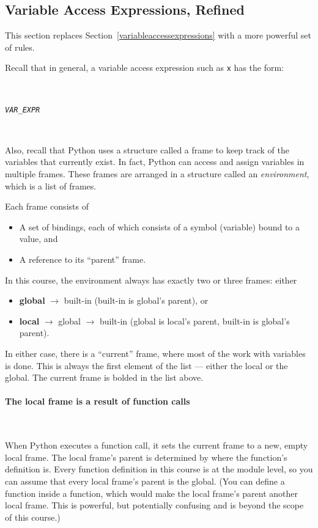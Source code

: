 \documentclass{article}
\newcommand{\expr}[1]{\texttt{#1}}
\newcommand{\ra}{ \ensuremath{\rightarrow} }
\newcommand{\mvar}[1]{\expr{\emph{\uppercase{#1}}}}
\newcommand{\myparagraph}[1]{\paragraph{#1} \ifhevea\else \strut \\ \strut \fi}
\newcommand{\pretabularspace}{\ifhevea\else \strut \\ \strut \fi}
\newcommand{\posttabularspace}{\ifhevea\else \strut \\ \strut \fi}
\begin{document}
\subsection{Variable Access Expressions, Refined}
\label{accesseswithfunctions}

This section replaces Section~\ref{variableaccessexpressions} with a more
powerful set of rules.

  Recall that in general, a variable access expression such as \expr{x} has the form:

  \pretabularspace
  \mvar{VAR\_EXPR}
  \posttabularspace

  Also, recall that Python uses a structure called a frame to keep track of the variables that currently exist. In fact, Python can access and assign variables in multiple frames. These frames are arranged in a structure called an \emph{environment}, which is a list of frames.


  Each frame consists of
  \begin{itemize}
    \item A set of bindings, each of which consists of a symbol (variable) bound to a value, and
    \item A reference to its ``parent'' frame.
  \end{itemize}
  In this course, the environment always has exactly two or three frames: either
  \begin{itemize}
    \item \textbf{global} \ra built-in (built-in is global's parent), or
    \item \textbf{local} \ra global \ra built-in (global is local's parent, built-in is global's parent).
  \end{itemize} In either case, there is a ``current'' frame, where most of
  the work with variables is done. This is always the first element of the list --- either the local or the global. The current frame is bolded in the list above.

\myparagraph{The local frame is a result of function calls}
When Python executes a function call, it sets the current frame to a new,
empty local frame.  The local frame's parent is determined by where the
function's definition is.  Every function definition in this course is at
the module level, so you can assume that every local frame's parent is the
global.  (You can define a function inside a function, which would make the
local frame's parent another local frame.  This is powerful, but
potentially confusing and is beyond the scope of this course.)
\end{document}
